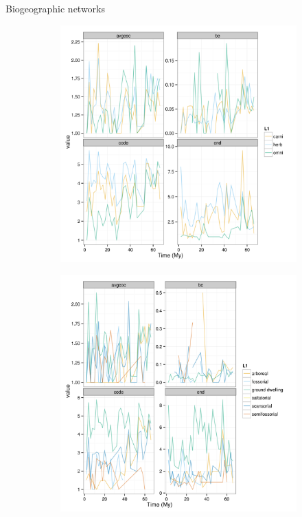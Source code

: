 \documentclass[final]{beamer}\usepackage[]{graphicx}\usepackage[]{color}
\newlength{\onecolwid}
\newlength{\twocolwid}
\begin{document}
\begin{frame}[t]
\begin{columns}
\begin{column}{\twocolwid}
      \begin{alertblock}{Biogeographic networks}
        \begin{figure}[ht]
          \begin{center}
            \begin{subfigure}[b]{\onecolwid}
              \centering
              \includegraphics[width = 0.8\onecolwid]{figure/diet_bin}
              \label{fig:net_diet}
            \end{subfigure}
            \begin{subfigure}[b]{\onecolwid}
              \centering
              \includegraphics[width = 0.8\onecolwid]{figure/loco_bin}

\end{subfigure}
\end{center}
\end{figure}
\end{alertblock}
\end{column}
\end{columns}
\end{frame}
\end{document}
